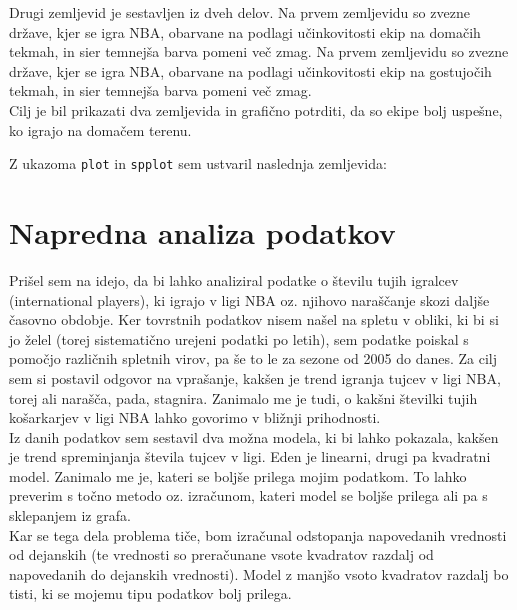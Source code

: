 \documentclass[11pt,a4paper]{article}
\begin{document}
\newline
Drugi zemljevid je sestavljen iz dveh delov. 
Na prvem zemljevidu so zvezne države, kjer se igra NBA, obarvane na podlagi učinkovitosti ekip na domačih tekmah, in sier temnejša barva pomeni več zmag.
Na prvem zemljevidu so zvezne države, kjer se igra NBA, obarvane na podlagi učinkovitosti ekip na gostujočih tekmah, in sier temnejša barva pomeni več zmag.\\
Cilj je bil prikazati dva zemljevida in grafično potrditi, da so ekipe bolj uspešne, ko igrajo na domačem terenu.

Z ukazoma \verb|plot| in \verb|spplot| sem ustvaril naslednja zemljevida:






\section{Napredna analiza podatkov}

Prišel sem na idejo, da bi lahko analiziral podatke o številu tujih igralcev (international players), ki igrajo v ligi NBA oz. njihovo naraščanje skozi daljše časovno obdobje. Ker tovrstnih podatkov nisem našel na spletu v obliki, ki bi si jo želel (torej sistematično urejeni podatki po letih), sem podatke poiskal s pomočjo različnih spletnih virov, pa še to le za sezone od 2005 do danes. Za cilj sem si postavil odgovor na vprašanje, kakšen je trend igranja tujcev v ligi NBA, torej ali narašča, pada, stagnira. Zanimalo me je tudi, o kakšni številki tujih košarkarjev v ligi NBA lahko govorimo v bližnji prihodnosti.\\

Iz danih podatkov sem sestavil dva možna modela, ki bi lahko pokazala, kakšen je trend spreminjanja števila tujcev v ligi. Eden je linearni, drugi pa kvadratni model. Zanimalo me je, kateri se boljše prilega mojim podatkom. 
To lahko preverim s točno metodo oz. izračunom, kateri model se boljše prilega ali pa s sklepanjem iz grafa. \\

Kar se tega dela problema tiče, bom izračunal odstopanja napovedanih vrednosti od dejanskih (te vrednosti so preračunane vsote kvadratov razdalj od napovedanih do dejanskih vrednosti). Model z manjšo vsoto kvadratov razdalj bo tisti, ki se mojemu tipu podatkov bolj prilega.\\
\end{document}
